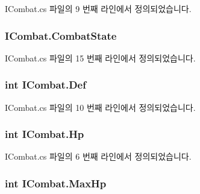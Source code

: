 I\+Combat.\+cs 파일의 9 번째 라인에서 정의되었습니다.

\subsubsection[{\texorpdfstring{Combat\+State}{CombatState}}]{ I\+Combat.\+Combat\+State\hspace{0.3cm}{\ttfamily [get]}}\hypertarget{interface_i_combat_aef944c90874b03051f60395f3c8532e4}{}\label{interface_i_combat_aef944c90874b03051f60395f3c8532e4}


I\+Combat.\+cs 파일의 15 번째 라인에서 정의되었습니다.

\subsubsection[{\texorpdfstring{Def}{Def}}]{\setlength{\rightskip}{0pt plus 5cm}int I\+Combat.\+Def\hspace{0.3cm}{\ttfamily [get]}}\hypertarget{interface_i_combat_a7d659a107f8e0f610cd74f1da0218e43}{}\label{interface_i_combat_a7d659a107f8e0f610cd74f1da0218e43}


I\+Combat.\+cs 파일의 10 번째 라인에서 정의되었습니다.

\subsubsection[{\texorpdfstring{Hp}{Hp}}]{\setlength{\rightskip}{0pt plus 5cm}int I\+Combat.\+Hp\hspace{0.3cm}{\ttfamily [get]}}\hypertarget{interface_i_combat_aa9d63fa3662b41ec000a73b9bfa663c4}{}\label{interface_i_combat_aa9d63fa3662b41ec000a73b9bfa663c4}


I\+Combat.\+cs 파일의 6 번째 라인에서 정의되었습니다.

\subsubsection[{\texorpdfstring{Max\+Hp}{MaxHp}}]{\setlength{\rightskip}{0pt plus 5cm}int I\+Combat.\+Max\+Hp\hspace{0.3cm}{\ttfamily [get]}}\hypertarget{interface_i_combat_a5c6ed297759d86d674077ee495226cc3}{}\label{interface_i_combat_a5c6ed297759d86d674077ee495226cc3}


